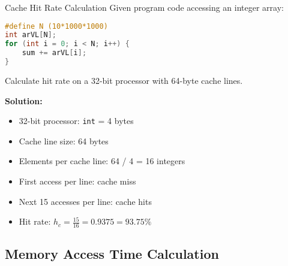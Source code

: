 \begin{example2}{Cache Hit Rate Calculation}
    Given program code accessing an integer array:
    
\begin{lstlisting}[language=C, style=basesmol]
#define N (10*1000*1000)
int arVL[N];
for (int i = 0; i < N; i++) {
    sum += arVL[i];
}
\end{lstlisting}

    Calculate hit rate on a 32-bit processor with 64-byte cache lines.
    
    \tcblower
    
    \textbf{Solution:}
    \begin{itemize}
        \item 32-bit processor: \texttt{int} = 4 bytes
        \item Cache line size: 64 bytes
        \item Elements per cache line: 64 / 4 = 16 integers
        \item First access per line: cache miss
        \item Next 15 accesses per line: cache hits
        \item Hit rate: $h_c = \frac{15}{16} = 0.9375 = 93.75\%$
    \end{itemize}
\end{example2}

\subsection{Memory Access Time Calculation}

